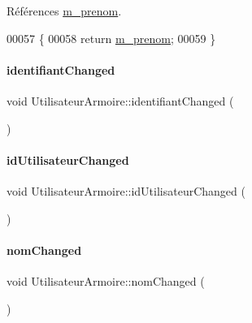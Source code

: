 Références \hyperlink{class_utilisateur_armoire_a652d7a57ec09963d16ab82838a5ffc51}{m\+\_\+prenom}.


\begin{DoxyCode}
00057 \{
00058     \textcolor{keywordflow}{return} \hyperlink{class_utilisateur_armoire_a652d7a57ec09963d16ab82838a5ffc51}{m\_prenom};
00059 \}
\end{DoxyCode}
\mbox{\label{class_utilisateur_armoire_a8d849ded67b0be0d0af52da8cc514b1d}} 
\paragraph{\texorpdfstring{identifiant\+Changed}{identifiantChanged}}
{\footnotesize\ttfamily void Utilisateur\+Armoire\+::identifiant\+Changed (\begin{DoxyParamCaption}{ }\end{DoxyParamCaption})\hspace{0.3cm}{\ttfamily [signal]}}

\mbox{\label{class_utilisateur_armoire_a7ec1ac0b2496562bb1016339ba24f346}} 
\paragraph{\texorpdfstring{id\+Utilisateur\+Changed}{idUtilisateurChanged}}
{\footnotesize\ttfamily void Utilisateur\+Armoire\+::id\+Utilisateur\+Changed (\begin{DoxyParamCaption}{ }\end{DoxyParamCaption})\hspace{0.3cm}{\ttfamily [signal]}}

\mbox{\label{class_utilisateur_armoire_a3e33ff50b8510ea1ed407c65480c4c53}} 
\paragraph{\texorpdfstring{nom\+Changed}{nomChanged}}
{\footnotesize\ttfamily void Utilisateur\+Armoire\+::nom\+Changed (\begin{DoxyParamCaption}{ }\end{DoxyParamCaption})\hspace{0.3cm}{\ttfamily [signal]}}

